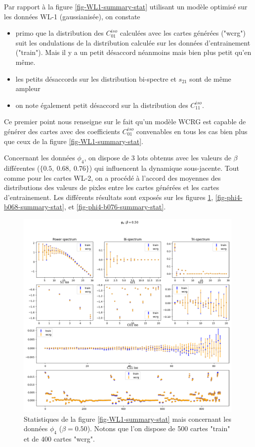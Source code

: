 \documentclass[12pt,twoside]{article}
\newcommand{\itemb}{\item[$\bullet$]}
\begin{document}
Par rapport à la figure \ref{fig-WL1-summary-stat} utilisant un modèle optimisé sur les données WL-1 (gaussianisée), on constate 
\begin{itemize}
\itemb primo que la distribution des $C_{01}^{iso}$  calculées avec les cartes générées ("wcrg") suit les ondulations de la distribution calculée sur les données d'entrainement ("train"). Mais il y a un petit désaccord néanmoins mais bien plus petit qu'en même.
\itemb les petits désaccords sur les distribution bi-spectre et $s_{21}$ sont de même ampleur
\itemb on note également petit désaccord  sur la distribution des $C_{11}^{iso}$.
\end{itemize}
Ce premier point nous renseigne sur le fait qu'un modèle WCRG est capable de générer des cartes avec des coefficients $C_{01}^{iso}$ convenables en tous les cas bien plus que ceux de la figure \ref{fig-WL1-summary-stat}. 

Concernant les données $\phi_4$, on dispose de 3 lots obtenus avec les valeurs de $\beta$ différentes ($\{0.5,\ 0.68,\ 0.76\}$) qui influencent la dynamique sous-jacente. Tout comme pour les cartes WL-2, on a procédé à l'accord des moyennes des distributions des valeurs de pixles entre les cartes générées et les  cartes d'entrainement. Les différents résultats sont exposés sur les figures \ref{fig-phi4-b050-summary-stat}, \ref{fig-phi4-b068-summary-stat}, et \ref{fig-phi4-b076-summary-stat}.

\begin{figure}
\centering
\includegraphics[width=0.99\textwidth]{fig-phi4-b050-summary-stat.png}
\caption{Statistiques de la figure \ref{fig-WL1-summary-stat} mais concernant les données $\phi_4$ ($\beta=0.50$).  Notons que l'on dispose de 500 cartes "train" et de 400 cartes "wcrg".}
\label{fig-phi4-b050-summary-stat}
\end{figure}
\end{document}
